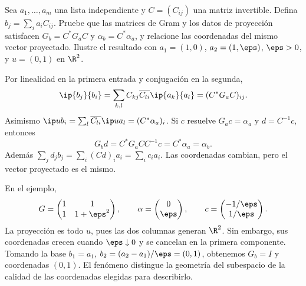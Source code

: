 \begin{ejercicio}\label{ej:ampl-gram-4}
Sea $a_1,\ldots,a_m$ una lista independiente y $C=(C_{ij})$ una matriz invertible. Defina $b_j=\sum_i a_iC_{ij}$. Pruebe que las matrices de Gram y los datos de proyección satisfacen $G_b=C^*G_aC$ y $\alpha_b=C^*\alpha_a$, y relacione las coordenadas del mismo vector proyectado. Ilustre el resultado con $a_1=(1,0)$, $a_2=(1,\eps)$, $\eps>0$, y $u=(0,1)$ en $\R^2$.
\end{ejercicio}
\begin{solucion}
Por linealidad en la primera entrada y conjugación en la segunda,
\[
 \ip{b_j}{b_i}=\sum_{k,l}C_{kj}\overline{C_{li}}\ip{a_k}{a_l}
 =(C^*G_aC)_{ij}.
\]
Asimismo $\ip u{b_i}=\sum_l\overline{C_{li}}\ip u{a_l}=(C^*\alpha_a)_i$. Si $c$ resuelve $G_ac=\alpha_a$ y $d=C^{-1}c$, entonces
\[
 G_bd=C^*G_aCC^{-1}c=C^*\alpha_a=\alpha_b.
\]
Además $\sum_jd_jb_j=\sum_i(Cd)_ia_i=\sum_ic_ia_i$. Las coordenadas cambian, pero el vector proyectado es el mismo.

En el ejemplo,
\[
 G=\begin{pmatrix}1&1\\1&1+\eps^2\end{pmatrix},\qquad
 \alpha=\begin{pmatrix}0\\\eps\end{pmatrix},\qquad
 c=\begin{pmatrix}-1/\eps\\1/\eps\end{pmatrix}.
\]
La proyección es todo $u$, pues las dos columnas generan $\R^2$. Sin embargo, sus coordenadas crecen cuando $\eps\downarrow0$ y se cancelan en la primera componente. Tomando la base $b_1=a_1$, $b_2=(a_2-a_1)/\eps=(0,1)$, obtenemos $G_b=I$ y coordenadas $(0,1)$. El fenómeno distingue la geometría del subespacio de la calidad de las coordenadas elegidas para describirlo.
\end{solucion}

